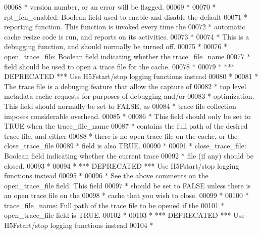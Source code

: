 \begin{DoxyCode}
00068 \textcolor{comment}{ *      version number, or an error will be flagged.}
00069 \textcolor{comment}{ *}
00070 \textcolor{comment}{ * rpt\_fcn\_enabled: Boolean field used to enable and disable the default}
00071 \textcolor{comment}{ *  reporting function.  This function is invoked every time the}
00072 \textcolor{comment}{ *  automatic cache resize code is run, and reports on its activities.}
00073 \textcolor{comment}{ *}
00074 \textcolor{comment}{ *  This is a debugging function, and should normally be turned off.}
00075 \textcolor{comment}{ *}
00076 \textcolor{comment}{ * open\_trace\_file: Boolean field indicating whether the trace\_file\_name}
00077 \textcolor{comment}{ *  field should be used to open a trace file for the cache.}
00078 \textcolor{comment}{ *}
00079 \textcolor{comment}{ *      *** DEPRECATED *** Use H5Fstart/stop logging functions instead}
00080 \textcolor{comment}{ *}
00081 \textcolor{comment}{ *  The trace file is a debuging feature that allow the capture of}
00082 \textcolor{comment}{ *  top level metadata cache requests for purposes of debugging and/or}
00083 \textcolor{comment}{ *  optimization.  This field should normally be set to FALSE, as}
00084 \textcolor{comment}{ *  trace file collection imposes considerable overhead.}
00085 \textcolor{comment}{ *}
00086 \textcolor{comment}{ *  This field should only be set to TRUE when the trace\_file\_name}
00087 \textcolor{comment}{ *  contains the full path of the desired trace file, and either}
00088 \textcolor{comment}{ *  there is no open trace file on the cache, or the close\_trace\_file}
00089 \textcolor{comment}{ *  field is also TRUE.}
00090 \textcolor{comment}{ *}
00091 \textcolor{comment}{ * close\_trace\_file: Boolean field indicating whether the current trace}
00092 \textcolor{comment}{ *  file (if any) should be closed.}
00093 \textcolor{comment}{ *}
00094 \textcolor{comment}{ *      *** DEPRECATED *** Use H5Fstart/stop logging functions instead}
00095 \textcolor{comment}{ *}
00096 \textcolor{comment}{ *  See the above comments on the open\_trace\_file field.  This field}
00097 \textcolor{comment}{ *  should be set to FALSE unless there is an open trace file on the}
00098 \textcolor{comment}{ *  cache that you wish to close.}
00099 \textcolor{comment}{ *}
00100 \textcolor{comment}{ * trace\_file\_name: Full path of the trace file to be opened if the}
00101 \textcolor{comment}{ *  open\_trace\_file field is TRUE.}
00102 \textcolor{comment}{ *}
00103 \textcolor{comment}{ *      *** DEPRECATED *** Use H5Fstart/stop logging functions instead}
00104 \textcolor{comment}{ *}

\end{DoxyCode}
